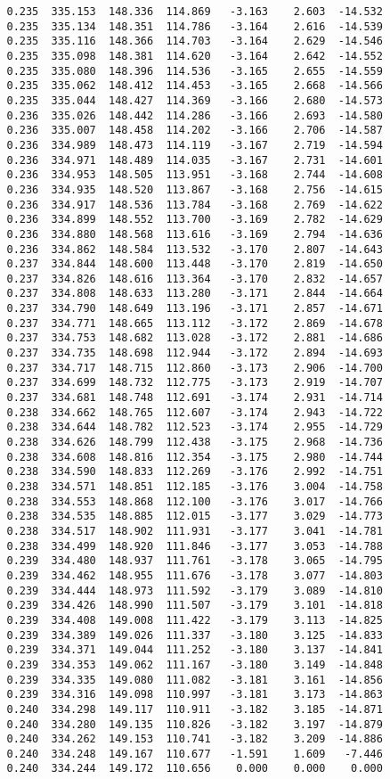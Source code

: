\begin{verbatim}
   0.235  335.153  148.336  114.869   -3.163    2.603  -14.532
   0.235  335.134  148.351  114.786   -3.164    2.616  -14.539
   0.235  335.116  148.366  114.703   -3.164    2.629  -14.546
   0.235  335.098  148.381  114.620   -3.164    2.642  -14.552
   0.235  335.080  148.396  114.536   -3.165    2.655  -14.559
   0.235  335.062  148.412  114.453   -3.165    2.668  -14.566
   0.235  335.044  148.427  114.369   -3.166    2.680  -14.573
   0.236  335.026  148.442  114.286   -3.166    2.693  -14.580
   0.236  335.007  148.458  114.202   -3.166    2.706  -14.587
   0.236  334.989  148.473  114.119   -3.167    2.719  -14.594
   0.236  334.971  148.489  114.035   -3.167    2.731  -14.601
   0.236  334.953  148.505  113.951   -3.168    2.744  -14.608
   0.236  334.935  148.520  113.867   -3.168    2.756  -14.615
   0.236  334.917  148.536  113.784   -3.168    2.769  -14.622
   0.236  334.899  148.552  113.700   -3.169    2.782  -14.629
   0.236  334.880  148.568  113.616   -3.169    2.794  -14.636
   0.236  334.862  148.584  113.532   -3.170    2.807  -14.643
   0.237  334.844  148.600  113.448   -3.170    2.819  -14.650
   0.237  334.826  148.616  113.364   -3.170    2.832  -14.657
   0.237  334.808  148.633  113.280   -3.171    2.844  -14.664
   0.237  334.790  148.649  113.196   -3.171    2.857  -14.671
   0.237  334.771  148.665  113.112   -3.172    2.869  -14.678
   0.237  334.753  148.682  113.028   -3.172    2.881  -14.686
   0.237  334.735  148.698  112.944   -3.172    2.894  -14.693
   0.237  334.717  148.715  112.860   -3.173    2.906  -14.700
   0.237  334.699  148.732  112.775   -3.173    2.919  -14.707
   0.237  334.681  148.748  112.691   -3.174    2.931  -14.714
   0.238  334.662  148.765  112.607   -3.174    2.943  -14.722
   0.238  334.644  148.782  112.523   -3.174    2.955  -14.729
   0.238  334.626  148.799  112.438   -3.175    2.968  -14.736
   0.238  334.608  148.816  112.354   -3.175    2.980  -14.744
   0.238  334.590  148.833  112.269   -3.176    2.992  -14.751
   0.238  334.571  148.851  112.185   -3.176    3.004  -14.758
   0.238  334.553  148.868  112.100   -3.176    3.017  -14.766
   0.238  334.535  148.885  112.015   -3.177    3.029  -14.773
   0.238  334.517  148.902  111.931   -3.177    3.041  -14.781
   0.238  334.499  148.920  111.846   -3.177    3.053  -14.788
   0.239  334.480  148.937  111.761   -3.178    3.065  -14.795
   0.239  334.462  148.955  111.676   -3.178    3.077  -14.803
   0.239  334.444  148.973  111.592   -3.179    3.089  -14.810
   0.239  334.426  148.990  111.507   -3.179    3.101  -14.818
   0.239  334.408  149.008  111.422   -3.179    3.113  -14.825
   0.239  334.389  149.026  111.337   -3.180    3.125  -14.833
   0.239  334.371  149.044  111.252   -3.180    3.137  -14.841
   0.239  334.353  149.062  111.167   -3.180    3.149  -14.848
   0.239  334.335  149.080  111.082   -3.181    3.161  -14.856
   0.239  334.316  149.098  110.997   -3.181    3.173  -14.863
   0.240  334.298  149.117  110.911   -3.182    3.185  -14.871
   0.240  334.280  149.135  110.826   -3.182    3.197  -14.879
   0.240  334.262  149.153  110.741   -3.182    3.209  -14.886
   0.240  334.248  149.167  110.677   -1.591    1.609   -7.446
   0.240  334.244  149.172  110.656    0.000    0.000    0.000
\end{verbatim}
